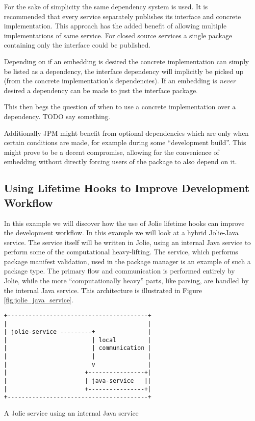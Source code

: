 For the sake of simplicity the same dependency system is used. It is
recommended that every service separately publishes its interface and concrete
implementation. This approach has the added benefit of allowing multiple
implementations of same service. For closed source services a single package
containing only the interface could be published.

Depending on if an embedding is desired the concrete implementation can simply
be listed as a dependency, the interface dependency will implicitly be picked
up (from the concrete implementation's dependencies). If an embedding is
\emph{never} desired a dependency can be made to just the interface package.

This then begs the question of when to use a concrete implementation over a
dependency. TODO say something.

Additionally JPM might benefit from optional dependencies which are only when
certain conditions are made, for example during some ``development build''.
This might prove to be a decent compromise, allowing for the convenience of
embedding without directly forcing users of the package to also depend on it.

\subsection{Using Lifetime Hooks to Improve Development Workflow}

In this example we will discover how the use of Jolie lifetime hooks can
improve the development workflow. In this example we will look at a hybrid
Jolie-Java service. The service itself will be written in Jolie, using an
internal Java service to perform some of the computational heavy-lifting.  The
 service, which performs package manifest validation, used in
the package manager is an example of such a package type. The primary flow and
communication is performed entirely by Jolie, while the more ``computationally
heavy'' parts, like parsing, are handled by the internal Java service.  This
architecture is illustrated in Figure \ref{fig:jolie_java_service}.

\begin{listing}[H]
\begin{verbatim}
+----------------------------------------+
|                                        |
| jolie-service ---------+               |
|                        | local         |
|                        | communication |
|                        |               |
|                        v               |
|                      +----------------+|
|                      | java-service   ||
|                      +----------------+|
+----------------------------------------+
\end{verbatim}
\caption{A Jolie service using an internal Java service}
\label{fig:jolie_java_service}
\end{listing}

